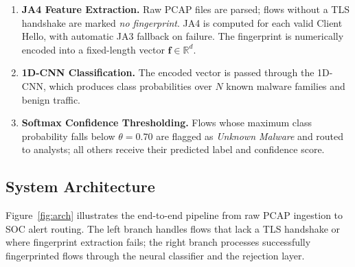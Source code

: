 \documentclass[12pt,a4paper]{report}
\begin{document}
\begin{enumerate}[leftmargin=*, label=\textbf{Stage \arabic{enumi}:}]
  \item \textbf{JA4 Feature Extraction.} Raw PCAP files are parsed; flows without
  a TLS handshake are marked \textit{no fingerprint}. JA4 is computed for each
  valid Client\,Hello, with automatic JA3 fallback on failure. The fingerprint
  is numerically encoded into a fixed-length vector $\mathbf{f} \in \mathbb{R}^d$.

  \item \textbf{1D-CNN Classification.} The encoded vector is passed through the
  1D-CNN, which produces class probabilities over $N$ known malware families and
  benign traffic.

  \item \textbf{Softmax Confidence Thresholding.} Flows whose maximum class
  probability falls below $\theta = 0.70$ are flagged as \textit{Unknown Malware}
  and routed to analysts; all others receive their predicted label and confidence
  score.
\end{enumerate}

\newpage
\subsection{System Architecture}

Figure~\ref{fig:arch} illustrates the end-to-end pipeline from raw PCAP ingestion
to SOC alert routing. The left branch handles flows that lack a TLS handshake or
where fingerprint extraction fails; the right branch processes successfully
fingerprinted flows through the neural classifier and the rejection layer.
\end{document}
